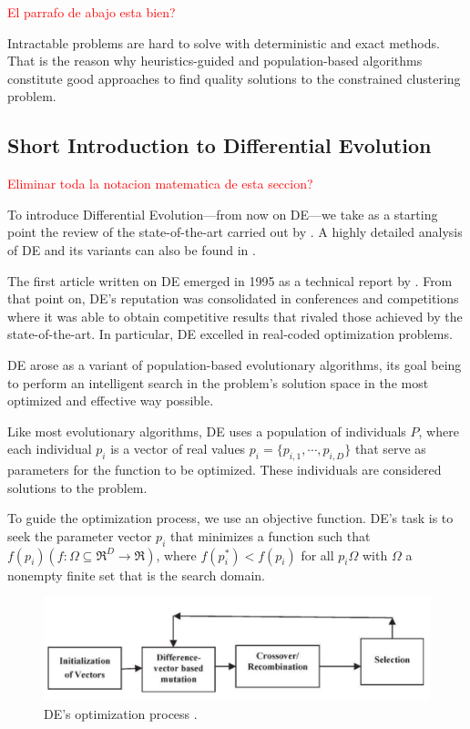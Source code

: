 \documentclass[review]{elsarticle}
\begin{document}
\textcolor{red}{El parrafo de abajo esta bien?}

Intractable problems are hard to solve with deterministic and exact methods. That is the reason why heuristics-guided and population-based algorithms constitute good approaches to find quality solutions to the constrained clustering problem.

\subsection{Short Introduction to Differential Evolution}

\textcolor{red}{Eliminar toda la notacion matematica de esta seccion?}

To introduce Differential Evolution---from now on DE---we take as a starting point the review of the state-of-the-art carried out by \cite{das2011differential}. A highly detailed analysis of DE and its variants can also be found in \cite{das2011differential}.

The first article written on DE emerged in 1995 as a technical report by \cite{noman2008differential}. From that point on, DE's reputation was consolidated in conferences and competitions where it was able to obtain competitive results that rivaled those achieved by the state-of-the-art. In particular, DE excelled in real-coded optimization problems.

DE arose as a variant of population-based evolutionary algorithms, its goal being to perform an intelligent search in the problem's solution space in the most optimized and effective way possible.

Like most evolutionary algorithms, DE uses a population of individuals $P$, where each individual $p_i$ is a vector of real values $p_i = \{p_{i,1},\cdots,p_{i,D}\}$ that serve as parameters for the function to be optimized. These individuals are considered solutions to the problem.

To guide the optimization process, we use an objective function. DE's task is to seek the parameter vector $p_i$ that minimizes a function such that $f(p_i)(f: \Omega \subseteq \mathfrak{R}^D \rightarrow \mathfrak{R})$, where $f(p_i^*) < f(p_i)$ for all $p_i \Omega$ with $\Omega$ a nonempty finite set that is the search domain.

\begin{figure}[!h]
	\centering
	\includegraphics[scale=0.4]{Figures/DEop.png}
	\caption{DE's optimization process \cite{das2011differential}.}\label{img:DE}
\end{figure}
\end{document}
